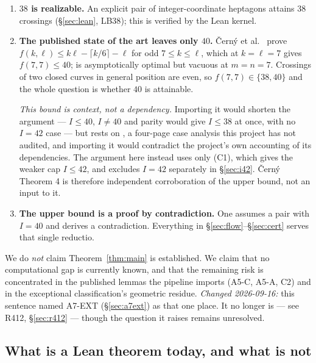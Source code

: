 \documentclass[11pt,a4paper]{article}
\theoremstyle{plain}
\theoremstyle{definition}
\theoremstyle{remark}
\begin{document}
\begin{enumerate}[leftmargin=*]
  \item \textbf{$38$ is realizable.} An explicit pair of integer-coordinate
    heptagons attains $38$ crossings (\S\ref{sec:lean}, \textsf{LB38}); this is
    verified by the Lean kernel.
  \item \textbf{The published state of the art leaves only $40$.}
    {\v C}ern{\'y} et al.~\cite[Theorem 4]{CernyEtAl2003} prove
    $f(k,\ell)\le k\ell-\lceil k/6\rceil-\ell$ for odd $7\le k\le\ell$, which at
    $k=\ell=7$ gives $f(7,7)\le 40$; \cite{AckermanKeszeghRote2022} is
    asymptotically optimal but vacuous at $m=n=7$. Crossings of two closed curves
    in general position are even, so $f(7,7)\in\{38,40\}$ and the whole question
    is whether $40$ is attainable.

    \emph{This bound is context, not a dependency.} Importing it would shorten
    the argument --- $I\le40$, $I\neq40$ and parity would give $I\le38$ at once,
    with no $I=42$ case --- but \cite[Theorem 4]{CernyEtAl2003} rests on
    \cite[Lemma 3]{CernyEtAl2003}, a four-page case analysis this project has not
    audited, and importing it would contradict the project's own accounting of
    its dependencies. The argument here instead uses only
    \cite[Lemma 1]{CernyEtAl2003} (\textsf{C1}), which gives the weaker cap
    $I\le42$, and excludes $I=42$ separately in \S\ref{sec:i42}. {\v C}ern{\'y}
    Theorem 4 is therefore independent corroboration of the upper bound, not an
    input to it.
  \item \textbf{The upper bound is a proof by contradiction.} One assumes a pair
    with $I=40$ and derives a contradiction. Everything in
    \S\ref{sec:flow}--\S\ref{sec:cert} serves that single reductio.
\end{enumerate}

We do \emph{not} claim Theorem~\ref{thm:main} is established. We claim that no
computational gap is currently known, and that the remaining risk is
concentrated in the published lemmas the pipeline imports (\textsf{A5-C},
\textsf{A5-A}, \textsf{C2}) and in the exceptional classification's geometric
residue. \emph{Changed 2026-09-16:} this sentence named \textsf{A7-EXT}
(\S\ref{sec:a7ext}) as that one place. It no longer is --- see \textsf{R412},
\S\ref{sec:r412} --- though the question it raises remains unresolved.

\subsection{What is a Lean theorem today, and what is not}\label{sec:leanmain}
\end{document}
